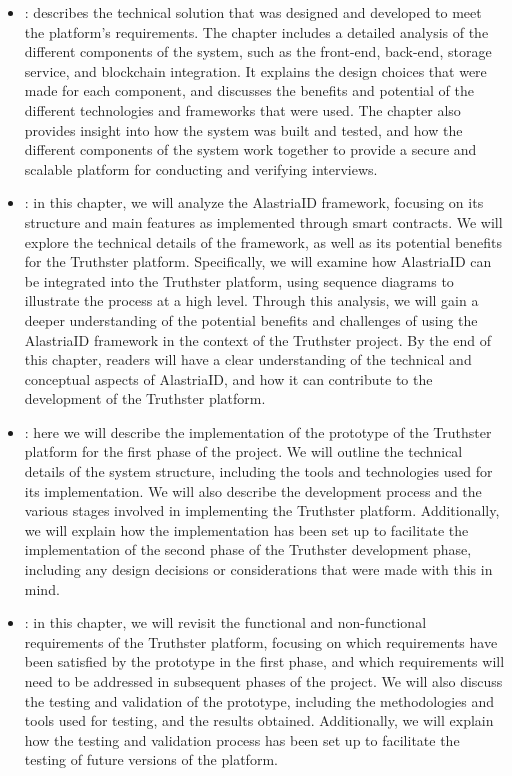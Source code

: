 \documentclass[target=mst,aauheader=]{thud}
\begin{document}
\begin{itemize}
    \item \textbf{}: describes the technical solution that was designed and developed to meet the platform's requirements. The chapter includes a detailed analysis of the different components of the system, such as the front-end, back-end, storage service, and blockchain integration. It explains the design choices that were made for each component, and discusses the benefits and potential of the different technologies and frameworks that were used. The chapter also provides insight into how the system was built and tested, and how the different components of the system work together to provide a secure and scalable platform for conducting and verifying interviews.
    \item \textbf{}: in this chapter, we will analyze the AlastriaID framework, focusing on its structure and main features as implemented through smart contracts. We will explore the technical details of the framework, as well as its potential benefits for the Truthster platform. Specifically, we will examine how AlastriaID can be integrated into the Truthster platform, using sequence diagrams to illustrate the process at a high level. Through this analysis, we will gain a deeper understanding of the potential benefits and challenges of using the AlastriaID framework in the context of the Truthster project. By the end of this chapter, readers will have a clear understanding of the technical and conceptual aspects of AlastriaID, and how it can contribute to the development of the Truthster platform.
    \item \textbf{}: here we will describe the implementation of the prototype of the Truthster platform for the first phase of the project. We will outline the technical details of the system structure, including the tools and technologies used for its implementation. We will also describe the development process and the various stages involved in implementing the Truthster platform. Additionally, we will explain how the implementation has been set up to facilitate the implementation of the second phase of the Truthster development phase, including any design decisions or considerations that were made with this in mind.
    \item \textbf{}: in this chapter, we will revisit the functional and non-functional requirements of the Truthster platform, focusing on which requirements have been satisfied by the prototype in the first phase, and which requirements will need to be addressed in subsequent phases of the project. We will also discuss the testing and validation of the prototype, including the methodologies and tools used for testing, and the results obtained. Additionally, we will explain how the testing and validation process has been set up to facilitate the testing of future versions of the platform.

\end{itemize}
\end{document}
